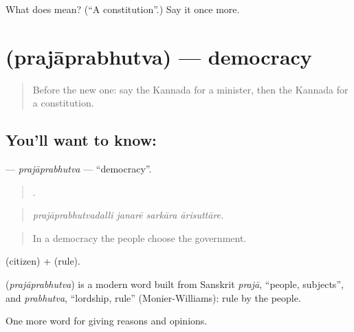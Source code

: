 \begin{tcolorbox}[breakable,colback=teal!4,colframe=teal!35!black,title={Before you move on}]
What does  mean? (\textquotedblleft{}A constitution\textquotedblright{}.) Say it once more.
\end{tcolorbox}
\section[\texorpdfstring{\kn{ಪ್ರಜಾಪ್ರಭುತ್ವ} (prajāprabhutva)}{ಪ್ರಜಾಪ್ರಭುತ್ವ (prajāprabhutva)}]{ (prajāprabhutva) — democracy}

\label{lesson:KA-C393-prajaprabhutva}



\begin{quote}
Before the new one: say the Kannada for a minister, then the Kannada for a constitution.
\end{quote}

\subsection*{You'll want to know: }
\textbf{} — \emph{prajāprabhutva} — \textquotedblleft{}democracy\textquotedblright{}.

\begin{quote}
   .
\end{quote}

\begin{quote}
\emph{prajāprabhutvadalli janarē sarkāra ārisuttāre.}
\end{quote}

\begin{quote}
In a democracy the people choose the government.
\end{quote}

 (citizen) +  (rule).

\begin{cousinweb}
\textbf{} (\emph{prajāprabhutva}) is a modern word built from Sanskrit \emph{prajā}, \textquotedblleft{}people, subjects\textquotedblright{}, and \emph{prabhutva}, \textquotedblleft{}lordship, rule\textquotedblright{} (Monier-Williams): rule by the people.
\end{cousinweb}

\begin{grammarlens}[title={What you've built}]
One more word for giving reasons and opinions.
\end{grammarlens}

